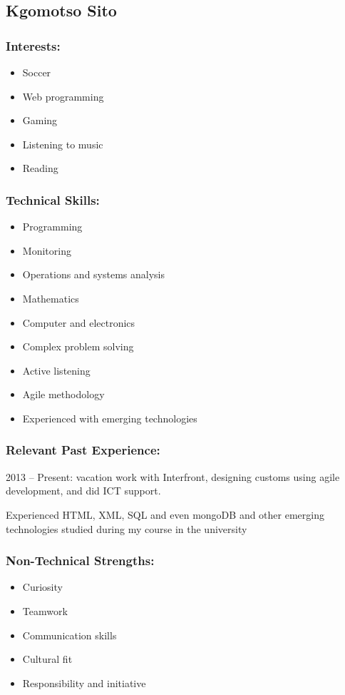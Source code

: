 \newpage
\subsection{Kgomotso Sito}
\subsubsection{Interests:}
	\begin{itemize}
		\item Soccer
		\item Web programming
		\item Gaming
		\item Listening to music 
		\item Reading 
	\end{itemize}
\subsubsection{Technical Skills:}
	\begin{itemize}
		\item Programming
		\item Monitoring
		\item Operations and systems analysis
		\item Mathematics
		\item Computer and electronics 
		\item Complex problem solving
		\item Active listening
		\item Agile methodology
		\item Experienced with emerging technologies
	\end{itemize}
	
\subsubsection{Relevant Past Experience:}
\par{2013 – Present: vacation work with Interfront, designing customs using agile development, and did ICT support.
}
\par{Experienced HTML, XML, SQL and even mongoDB and other emerging technologies studied during my course in the university
}
\subsubsection{Non-Technical Strengths:}
\begin{itemize}
		\item Curiosity
		\item Teamwork
		\item Communication skills
		\item Cultural fit
		\item Responsibility and initiative
	\end{itemize}
